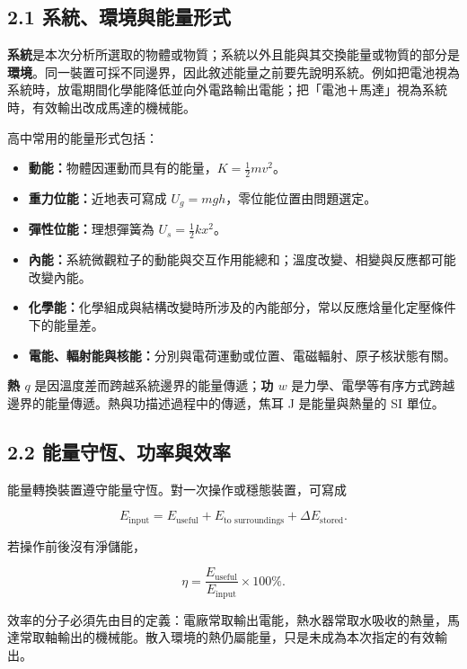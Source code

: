 \documentclass[11pt,a4paper]{article}
\providecommand{\tightlist}{%
  \setlength{\itemsep}{0pt}\setlength{\parskip}{0pt}}
\begin{document}
\subsection{2.1 系統、環境與能量形式}\label{ux7cfbux7d71ux74b0ux5883ux8207ux80fdux91cfux5f62ux5f0f}

\textbf{系統}是本次分析所選取的物體或物質；系統以外且能與其交換能量或物質的部分是\textbf{環境}。同一裝置可採不同邊界，因此敘述能量之前要先說明系統。例如把電池視為系統時，放電期間化學能降低並向外電路輸出電能；把「電池＋馬達」視為系統時，有效輸出改成馬達的機械能。

高中常用的能量形式包括：

\begin{itemize}
\tightlist
\item
  \textbf{動能：}物體因運動而具有的能量，\(K=\frac12mv^2\)。
\item
  \textbf{重力位能：}近地表可寫成 \(U_g=mgh\)，零位能位置由問題選定。
\item
  \textbf{彈性位能：}理想彈簧為 \(U_s=\frac12kx^2\)。
\item
  \textbf{內能：}系統微觀粒子的動能與交互作用能總和；溫度改變、相變與反應都可能改變內能。
\item
  \textbf{化學能：}化學組成與結構改變時所涉及的內能部分，常以反應焓量化定壓條件下的能量差。
\item
  \textbf{電能、輻射能與核能：}分別與電荷運動或位置、電磁輻射、原子核狀態有關。
\end{itemize}

\textbf{熱 \(q\)} 是因溫度差而跨越系統邊界的能量傳遞；\textbf{功 \(w\)} 是力學、電學等有序方式跨越邊界的能量傳遞。熱與功描述過程中的傳遞，焦耳 J 是能量與熱量的 SI 單位。

\subsection{2.2 能量守恆、功率與效率}\label{ux80fdux91cfux5b88ux6046ux529fux7387ux8207ux6548ux7387}

能量轉換裝置遵守能量守恆。對一次操作或穩態裝置，可寫成

\[
E_{\text{input}}=E_{\text{useful}}+E_{\text{to surroundings}}+\Delta E_{\text{stored}}.
\]

若操作前後沒有淨儲能，

\[
\eta=\frac{E_{\text{useful}}}{E_{\text{input}}}\times100\%.
\]

效率的分子必須先由目的定義：電廠常取輸出電能，熱水器常取水吸收的熱量，馬達常取軸輸出的機械能。散入環境的熱仍屬能量，只是未成為本次指定的有效輸出。
\end{document}
